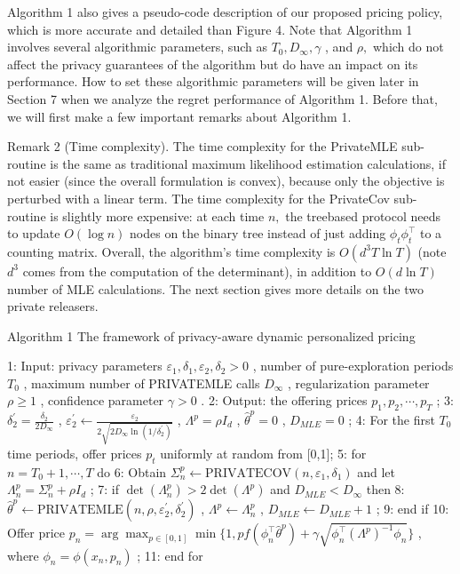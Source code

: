 Algorithm 1 also gives a pseudo-code description of our proposed pricing policy, which is more accurate and detailed than Figure 4. Note that Algorithm 1 involves several algorithmic parameters, such as \(T _ { 0 } , D _ { \infty } , \gamma\) , and \(\rho ,\) which do not affect the privacy guarantees of the algorithm but do have an impact on its performance. How to set these algorithmic parameters will be given later in Section 7 when we analyze the regret performance of Algorithm 1. Before that, we will first make a few important remarks about Algorithm 1.

Remark 2 (Time complexity). The time complexity for the PrivateMLE sub-routine is the same as traditional maximum likelihood estimation calculations, if not easier (since the overall formulation is convex), because only the objective is perturbed with a linear term. The time complexity for the PrivateCov sub-routine is slightly more expensive: at each time \(n ,\) the treebased protocol needs to update \(O ( \log n )\) nodes on the binary tree instead of just adding \(\phi _ { t } \phi _ { t } ^ { \top }\) to a counting matrix. Overall, the algorithm's time complexity is \(O ( d ^ { 3 } T \ln T )\) (note \(d ^ { 3 }\) comes from the computation of the determinant), in addition to \(O ( d \ln T )\) number of MLE calculations. The next section gives more details on the two private releasers.

Algorithm 1 The framework of privacy-aware dynamic personalized pricing

1: Input: privacy parameters \(\varepsilon_{1},\delta_{1},\varepsilon_{2},\delta_{2}>0\) , number of pure-exploration periods \(T_{0}\) , maximum number of PRIVATEMLE calls \(D_{\infty}\) , regularization parameter \(\rho\geq1\) , confidence parameter \(\gamma>0\) . 
2: Output: the offering prices \(p_{1}, p_{2}, \cdots, p_{T}\) ; 
3: \(\delta_{2}^{\prime} = \frac{\delta_{2}}{2D_{\infty}}\) , \(\varepsilon_{2}^{\prime} \leftarrow \frac{\varepsilon_{2}}{2\sqrt{2D_{\infty}\ln(1/\delta_{2}^{\prime})}}\) , \(\Lambda^{p} = \rho I_{d}\) , \(\widehat{\theta}^{p} = 0\) , \(D_{MLE} = 0\) ; 
4: For the first \(T_{0}\) time periods, offer prices \(p_{t}\) uniformly at random from {[}0,1{]}; 
5: for \(n = T_{0} + 1, \cdots, T\) do 
6: Obtain \(\Sigma_{n}^{p} \leftarrow \text{PRIVATECOV}(n, \varepsilon_{1}, \delta_{1})\) and let \(\Lambda_{n}^{p} = \Sigma_{n}^{p} + \rho I_{d}\) ; 
7: if \(\det(\Lambda_{n}^{p}) > 2\det(\Lambda^{p})\) and \(D_{MLE} < D_{\infty}\) then 
8: \(\widehat{\theta}^{p} \leftarrow \text{PRIVATEMLE}(n, \rho, \varepsilon_{2}^{\prime}, \delta_{2}^{\prime})\) , \(\Lambda^{p} \leftarrow \Lambda_{n}^{p}\) , \(D_{MLE} \leftarrow D_{MLE} + 1\) ; 
9: end if 
10: Offer price \(p_{n} = \arg\max_{p \in [0,1]} \min\{1, pf(\phi_{n}^{\top}\widehat{\theta}^{p}) + \gamma\sqrt{\phi_{n}^{\top}(\Lambda^{p})^{-1}\phi_{n}}\}\) , where \(\phi_{n} = \phi(x_{n}, p_{n})\) ; 
11: end for

